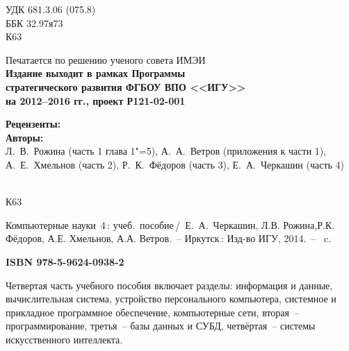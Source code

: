 \documentclass[a4paper,14pt, openany, twoside, final]{extbook} %
\begin{document}
\newpage
\begin{mygroup}
\thispagestyle{empty}
\noindent УДК 681.3.06 (075.8)\\ %
\noindent ББК 32.97я73\\
\noindent\mbox{}\hspace{2em}К63
\begin{center}\small
Печатается по решению ученого совета ИМЭИ\\[2ex]
\bfseries Издание выходит в рамках Программы\\
стратегического развития ФГБОУ ВПО <<ИГУ>>\\
на 2012--2016 гг., проект Р121-02-001
\end{center}
\vspace{0.5ex}
\begin{center}\small
  \textbf{Рецензенты:} \\
  \textbf{Авторы:}\\
  Л.~В.~Рожина (часть 1 глава 1"=5), А.~А.~Ветров (приложения к части 1),\\
  А.~Е.~Хмельнов (часть 2), Р.~К.~Фёдоров (часть 3), Е.~А.~Черкашин (часть 4)
\end{center}
\vfill
\noindent\begin{minipage}[t]{2em}
\noindent\mbox{}\\
К63
\end{minipage}%
\begin{minipage}[t]{0.95\linewidth}
\setlength{\parindent}{5ex}

Компьютерные науки~4\,{}: учеб.~пособие\,/~Е.~А.~Черкашин, Л.В. Рожина,Р.К. Фёдоров, А.Е. Хмельнов, А.А. Ветров.~-- Иркутск\,: Изд-во ИГУ, 2014.~-- \pageref{lastpage}~c.

{\bfseries ISBN 978-5-9624-0938-2}
\vspace{2ex}

\begingroup\footnotesize\parskip0pt
\vspace{1ex}


Четвертая часть учебного пособия включает разделы: информация и данные, вычислительная система, устройство персонального компьютера, системное и прикладное программное обеспечение, компьютерные сети, вторая~--  программирование, третья~-- базы данных и СУБД, четвёртая~-- системы искусственного интеллекта.


\end{minipage}
\end{mygroup}
\end{document}
